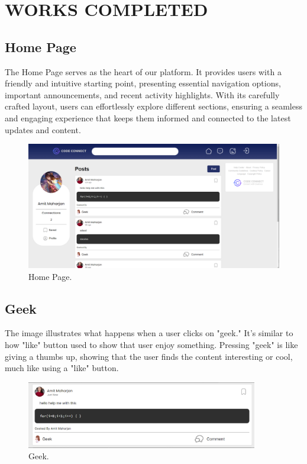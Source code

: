 \chapter{WORKS COMPLETED}

\section{Home Page}
The Home Page serves as the heart of our platform. It provides users with a friendly and intuitive starting point, presenting essential navigation options, important announcements, and recent activity highlights. With its carefully crafted layout, users can effortlessly explore different sections, ensuring a seamless and engaging experience that keeps them informed and connected to the latest updates and content.
\begin{figure}[ht]
    \centering
    \includegraphics[width=1\textwidth]{Outcome-ss/homepage.png}
    \caption{Home Page.}
    \label{fig:Home Page}
\end{figure}

\section{Geek}
The image illustrates what happens when a user clicks on "geek." It's similar to how "like" button used to show that user enjoy something. Pressing "geek" is like giving a thumbs up, showing that the user finds the content interesting or cool, much like using a "like" button.
\begin{figure}[ht]
    \centering
    \includegraphics[width=0.9\textwidth]{Outcome-ss/geek.png}
    \caption{Geek.}
    \label{fig:Geek}
\end{figure}
\newpage
